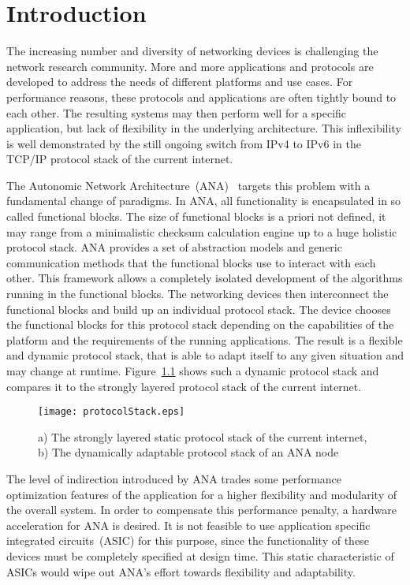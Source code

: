 
\chapter{\label{introduction}Introduction}

The increasing number and diversity of networking devices is challenging the network research community. More and more applications and protocols are developed to address the needs of different platforms and use cases. For performance reasons, these protocols and applications are often tightly bound to each other. The resulting systems may then perform well for a specific application, but lack of flexibility in the underlying architecture. This inflexibility is well demonstrated by the still ongoing switch from IPv4 to IPv6 in the TCP/IP protocol stack of the current internet.

The Autonomic Network Architecture~(ANA)~\cite{ana} targets this problem with a fundamental change of paradigms. In ANA, all functionality is encapsulated in so called functional blocks. The size of functional blocks is a priori not defined, it may range from a minimalistic checksum calculation engine up to a huge holistic protocol stack. ANA provides a set of abstraction models and generic communication methods that the functional blocks use to interact with each other. This framework allows a completely isolated development of the algorithms running in the functional blocks. The networking devices then interconnect the functional blocks and build up an individual protocol stack. The device chooses the functional blocks for this protocol stack depending on the capabilities of the platform and the requirements of the running applications. The result is a flexible and dynamic protocol stack, that is able to adapt itself to any given situation and may change at runtime. Figure~\ref{protocolStack.eps} shows such a dynamic protocol stack and compares it to the strongly layered protocol stack of the current internet.

\begin{figure}
  \begin{center}
		 \texttt{[image: protocolStack.eps]}
  \caption{a) The strongly layered static protocol stack of the current internet, b) The dynamically adaptable protocol stack of an ANA node}
  \label{protocolStack.eps}
  \end{center}
\end{figure}
The level of indirection introduced by ANA trades some performance optimization features of the application for a higher flexibility and modularity of the overall system. In order to compensate this performance penalty, a hardware acceleration for ANA is desired. It is not feasible to use application specific integrated circuits~(ASIC) for this purpose, since the functionality of these devices must be completely specified at design time. This static characteristic of ASICs would wipe out ANA's effort towards flexibility and adaptability.

